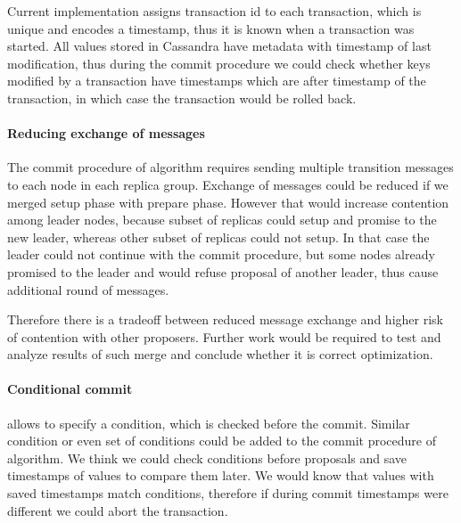Current implementation assigns transaction id to each transaction, which is unique and encodes a timestamp, thus it is known when a transaction was started. All values stored in Cassandra have metadata with timestamp of last modification, thus during the commit procedure we could check whether keys modified by a transaction have timestamps which are after timestamp of the transaction, in which case the transaction would be rolled back.

\paragraph{Reducing exchange of messages}
The commit procedure of \mpt algorithm requires sending multiple transition messages to each node in each replica group. Exchange of messages could be reduced if we merged setup phase with prepare phase. However that would increase contention among leader nodes, because subset of replicas could setup and promise to the new leader, whereas other subset of replicas could not setup.  In that case the leader could not continue with the commit procedure, but some nodes already promised to the leader and would refuse proposal of another leader, thus cause additional round of messages. 

Therefore there is a tradeoff between reduced message exchange and higher risk of contention with other proposers. Further work would be required to test and analyze results of such merge and conclude whether it is correct optimization.


\paragraph{Conditional commit}
\lwt allows to specify a condition, which is checked before the commit. Similar condition or even set of conditions could be added to the commit procedure of \mpt algorithm. We think we could check conditions before proposals and save timestamps of values to compare them later. We would know that values with saved timestamps match conditions, therefore if during commit timestamps were different we could abort the transaction.

